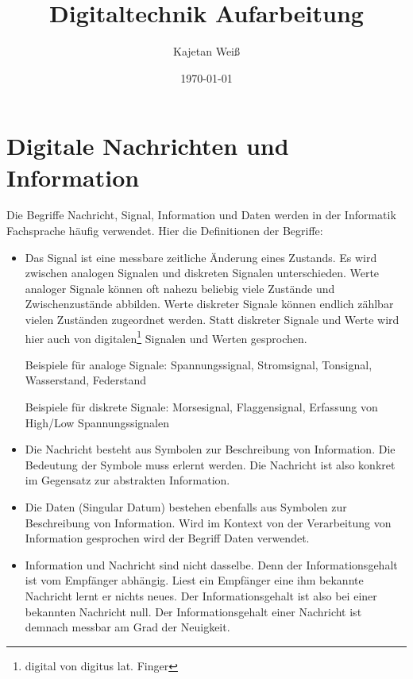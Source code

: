 \documentclass[11pt,a4paper]{scrreprt}
\begin{document}
\title{Digitaltechnik Aufarbeitung}
\author{Kajetan Weiß}
\date{\today}
\maketitle



\tableofcontents

\chapter{Digitale Nachrichten und Information}
Die Begriffe Nachricht, Signal, Information und Daten werden in der Informatik Fachsprache häufig verwendet. Hier die Definitionen der Begriffe:

\begin{itemize}
\item{}
Das Signal ist eine messbare zeitliche Änderung eines Zustands. Es wird zwischen analogen Signalen und diskreten Signalen unterschieden. Werte analoger Signale können oft nahezu beliebig viele Zustände und Zwischenzustände abbilden. Werte diskreter Signale können endlich zählbar vielen Zuständen zugeordnet werden. Statt diskreter Signale und Werte wird hier auch von digitalen\footnote{digital von digitus lat. Finger} Signalen und Werten gesprochen.

Beispiele für analoge Signale: Spannungssignal, Stromsignal, Tonsignal, Wasserstand, Federstand

Beispiele für diskrete Signale: Morsesignal, Flaggensignal, Erfassung von High/Low Spannungssignalen

\item{}
Die Nachricht besteht aus Symbolen zur Beschreibung von Information. Die Bedeutung der Symbole muss erlernt werden. Die Nachricht ist also konkret im Gegensatz zur abstrakten Information.

\item{}
Die Daten {\small(Singular Datum)} bestehen ebenfalls aus Symbolen zur Beschreibung von Information. Wird im Kontext von der Verarbeitung von Information gesprochen wird der Begriff Daten verwendet.

\item{}
Information und Nachricht sind nicht dasselbe. Denn der Informationsgehalt ist vom Empfänger abhängig. Liest ein Empfänger eine ihm bekannte Nachricht lernt er nichts neues. Der Informationsgehalt ist also bei einer bekannten Nachricht null. Der Informationsgehalt einer Nachricht ist demnach messbar am Grad der Neuigkeit.
\end{itemize}
\end{document}
